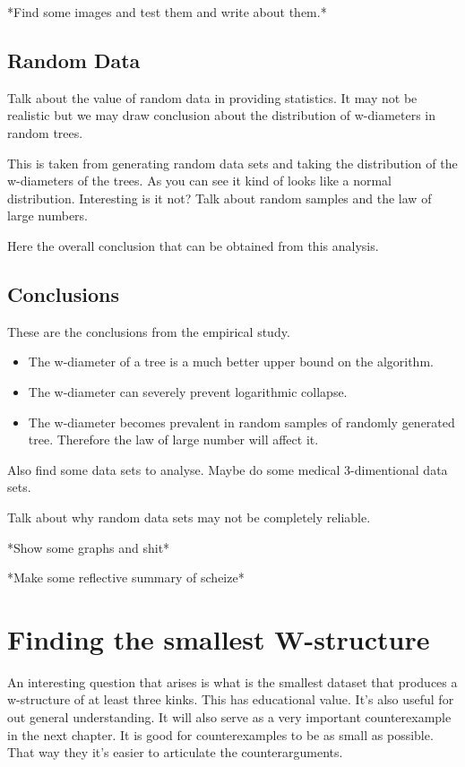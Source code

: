*Find some images and test them and write about them.*

\subsection{Random Data}


Talk about the value of random data in providing statistics. It may not be realistic but we may draw conclusion about the distribution of w-diameters in random trees.

This is taken from generating random data sets and taking the distribution of the w-diameters of the trees. As you can see it kind of looks like a normal distribution. Interesting is it not? Talk about random samples and the law of large numbers.

Here the overall conclusion that can be obtained from this analysis.

\subsection{Conclusions}

These are the conclusions from the empirical study.

\begin{itemize}
    \item The w-diameter of a tree is a much better upper bound on the algorithm.
    \item The w-diameter can severely prevent logarithmic collapse.
    \item The w-diameter becomes prevalent in random samples of randomly generated tree. Therefore the law of large number will affect it.
\end{itemize}



Also find some data sets to analyse. Maybe do some medical 3-dimentional data sets.

Talk about why random data sets may not be completely reliable.

*Show some graphs and shit*

*Make some reflective summary of scheize*

\section{Finding the smallest W-structure}

An interesting question that arises is what is the smallest dataset that produces a w-structure of at least three kinks. This has educational value. It's also useful for out general understanding. It will also serve as a very important counterexample in the next chapter. It is good for counterexamples to be as small as possible. That way they it's easier to articulate the counterarguments.

